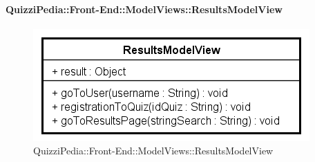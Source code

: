 \paragraph{QuizziPedia::Front-End::ModelViews::ResultsModelView}
	
	\label{QuizziPedia::Front-End::ModelViews::ResultsModelView}
	
	\begin{figure}[ht]
		\centering
		\includegraphics[scale=0.8,keepaspectratio]{UML/Classi/Front-End/QuizziPedia_Front-end_ModelView_ResultsModelView.png}
		\caption{QuizziPedia::Front-End::ModelViews::ResultsModelView}
	\end{figure} \FloatBarrier
	
